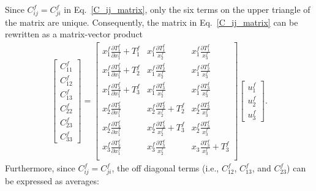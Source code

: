 Since $C_{ij}^f = C_{ji}^f$ in Eq.\ \eqref{C_ij_matrix}, only the six terms on the upper triangle of the matrix are unique. Consequently, the matrix in Eq.\ \eqref{C_ij_matrix} can be rewritten as a matrix-vector product
%
\begin{eqnarray}
\begin{bmatrix}
C_{11}^f \\ C_{12}^f \\ C_{13}^f \\ C_{22}^f \\
C_{23}^f \\ C_{33}^f 
\end{bmatrix}  = 
%
\begin{bmatrix}
x_1^f \frac{\partial T_1^f}{\partial x_1^f} + T_1^f & x_1^f \frac{\partial T_1^f}{x_2^f} & x_1^f \frac{\partial T_1^f}{x_3^f} \\
x_1^f \frac{\partial T_2^f}{\partial x_1^f} + T_2^f & x_1^f \frac{\partial T_2^f}{x_2^f} & x_1^f \frac{\partial T_2^f}{x_3^f} \\
x_1^f \frac{\partial T_3^f}{\partial x_1^f} + T_3^f & x_1^f \frac{\partial T_3^f}{x_2^f} & x_1^f \frac{\partial T_3^f}{x_3^f} \\
x_2^f \frac{\partial T_2^f}{\partial x_1^f} & x_2^f \frac{\partial T_2^f}{x_2^f} + T_2^f & x_2^f \frac{\partial T_2^f}{x_3^f} \\
x_2^f \frac{\partial T_3^f}{\partial x_1^f} & x_2^f \frac{\partial T_3^f}{x_2^f} + T_3^f & x_2^f \frac{\partial T_3^f}{x_3^f} \\
x_3^f \frac{\partial T_3^f}{\partial x_1^f} & x_3^f \frac{\partial T_3^f}{x_2^f} & x_3 \frac{\partial T_3^f}{x_3^f} + T_3^f \\
\end{bmatrix}
%
\begin{bmatrix}
u_1^f \\ u_2^f \\ u_3^f 
\end{bmatrix} .
%
\end{eqnarray}
%
Furthermore, since $C_{ij}^f = C_{ji}^f$, the off diagonal terms (i.e., $C_{12}^f$, $C_{13}^f$, and $C_{23}^f$) can be expressed as averages:
%
